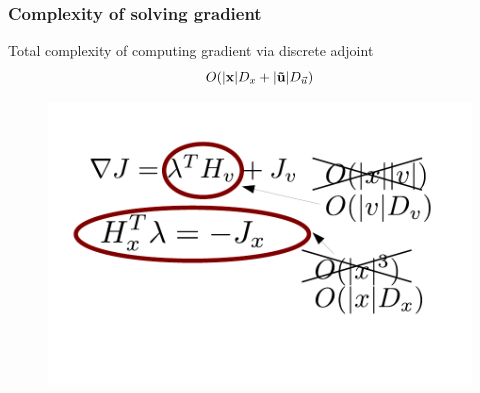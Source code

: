 \begin{frame}[t]\frametitle{Complexity of solving gradient}
    
\begin{block}{Total complexity of computing gradient via discrete adjoint}
\begin{equation}
    O(|\mathbf{x}|D_x + |\mathbf{\vec{u}}|D_{\vec{u}})
\end{equation}
\end{block}

\begin{figure}
\includegraphics[width=.8\columnwidth]{figs-gen/complexity}
\end{figure}

\end{frame}



